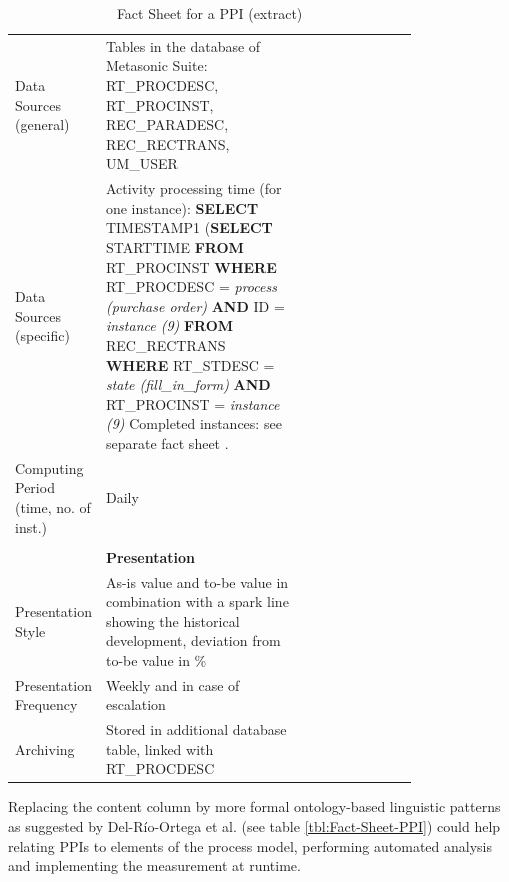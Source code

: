 \begin{table}[htbp]
\begin{tabular}[t]{@{}l p{0.5\linewidth} p{0.3\linewidth} @{}}
		\\
		Data Sources (general) & Tables in the database of Metasonic Suite:
		RT\_PROCDESC, RT\_PROCINST, REC\_PARADESC, REC\_RECTRANS, UM\_USER
		\\
		Data Sources (specific) & Activity processing time (for one instance):\newline
		\textbf{SELECT} TIMESTAMP1  \newline
		(\textbf{SELECT} STARTTIME \newline
		\textbf{FROM} RT\_PROCINST \newline
		\textbf{WHERE} RT\_PROCDESC = \textit{process (purchase order)}\newline
		\textbf{AND} ID = \textit{instance (9)}\newline
		\textbf{FROM} REC\_RECTRANS\newline
		\textbf{WHERE} RT\_STDESC = \textit{\textit{state (fill\_in\_form)}}\newline
		\textbf{AND} RT\_PROCINST = \textit{instance (9)}
		Completed instances: see separate fact sheet .
		\\
		Computing Period (time, no. of inst.) & Daily
		\\
		& &
		\\
		& \textbf{Presentation}
		\\
		Presentation Style & As-is value and to-be value in combination with a spark line showing the historical development, deviation from to-be value in \%
		\\
		Presentation Frequency & Weekly and in case of escalation
		\\
		Archiving & Stored in additional database table, linked with RT\_PROCDESC
		\\
		
\bottomrule
\end{tabular}
\caption{Fact Sheet for a PPI (extract)}
\label{tbl:Fact-Sheet}
\end{table}

Replacing the content column by more formal ontology-based linguistic patterns as suggested by Del-Río-Ortega et al. (see table \ref{tbl:Fact-Sheet-PPI}) could help relating PPIs to elements of the process model, performing automated analysis \cite{article:ProcessPerfInd} and implementing the measurement at runtime. 

